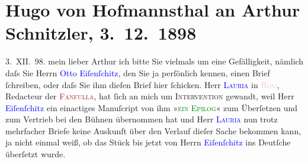 

               \section[Hugo von Hofmannsthal an Arthur Schnitzler, 3. 12. 1898]{ Hugo von Hofmannsthal an Arthur Schnitzler, 3. 12. 1898}\nopagebreak{}\rehead{ }\normalsize\beginnumbering{} \toendnotes[C]{\smallbreak\pagebreak[2]} 
\pstart
           \raggedleft{}{\pb}3. XII. 98.\pend
           \pstart{}mein lieber Arthur\pend\pstart
           ich bitte Sie vielmals um eine Gefälligkeit, nämlich daſs Sie Herrn \textcolor{blue}{Otto Eiſenſchitz}{}\ledrightnote{\textcolor{blue}{Otto Eisenschitz}}, den Sie ja perſönlich kennen,
                    einen Brief ſchreiben, oder daſs Sie ihm dieſen Brief hier ſchicken.\pend
           \pstart
           Herr \textcolor{blue}{\textsc{Lauria}}{}\ledrightnote{\textcolor{blue}{Amilcare Lauria}} in \textcolor{pink}{\textsc{Rom}}{}\ledrightnote{\textcolor{pink}{Rom}}, Redacteur der \textcolor{brown}{\textsc{Fanfulla}}{}\ledrightnote{\textcolor{brown}{Fanfulla della domenica}}, hat ſich an mich um \textsc{Intervention}{ }{\pb}gewandt, weil Herr \textcolor{blue}{Eiſenſchitz}{}\ledrightnote{\textcolor{blue}{Otto Eisenschitz}} ein einactiges Manuſcript von ihm
                        »\textcolor{green}{\textsc{ein Epilog}}{}\ledrightnote{\textcolor{green}{Ein Epilog}}« zum Überſetzen und zum Vertrieb bei den Bühnen übernommen hat und
                    Herr \textcolor{blue}{\textsc{Lauria}}{}\ledrightnote{\textcolor{blue}{Amilcare Lauria}} nun trotz mehrfacher Briefe keine Auskunft über den Verlauf dieſer
                    Sache bekommen kann, ja nicht einmal {\pb}weiß, ob das Stück bis jetzt
                        \introOben{}von Herrn \textcolor{blue}{Eiſenſchitz}{}\ledrightnote{\textcolor{blue}{Otto Eisenschitz}}\introOben{} ins Deutſche überſetzt wurde.\pend
